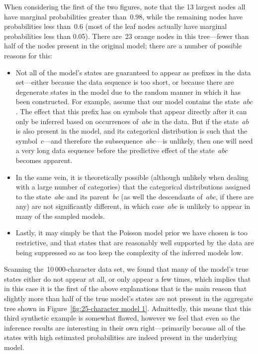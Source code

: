 \documentclass[12pt,a4paper]{article}
\begin{document}
When considering the first of the two figures, note that the 13 largest nodes
all have marginal probabilities greater than~0.98, while the remaining nodes
have probabilities less than~0.6 (most of the leaf nodes actually have marginal
probabilities less than 0.05). There are~23 orange nodes in this tree---fewer
than half of the nodes present in the original model; there are a number of
possible reasons for this:
\begin{itemize}
  \item Not all of the model's states are guaranteed to appear as prefixes in
    the data set---either because the data sequence is too short, or because
    there are degenerate states in the model due to the random manner in which
    it has been constructed. For example, assume that our model contains the
    state~\(abc\). The effect that this prefix has on symbols that appear
    directly after it can only be inferred based on occurrences of~\(abc\) in
    the data. But if the state~\(ab\) is also present in the model, and its
    categorical distribution is such that the symbol~\(c\)---and therefore the
    subsequence~\(abc\)---is unlikely, then one will need a very long data
    sequence before the predictive effect of the state~\(abc\) becomes
    apparent.
  \item In the same vein, it is theoretically possible (although unlikely when
    dealing with a large number of categories) that the categorical
    distributions assigned to the state~\(abc\) and its parent~\(bc\) (as well
    the descendants of~\(abc\), if there are any) are not significantly
    different, in which case~\(abc\) is unlikely to appear in many of the
    sampled models.
  \item Lastly, it may simply be that the Poisson model prior we have chosen is
    too restrictive, and that states that are reasonably well supported by the
    data are being suppressed so as too keep the complexity of the inferred
    models low.
\end{itemize}

Scanning the~10\,000-character data set, we found that many of the model's true
states either do not appear at all, or only appear a few times, which implies
that in this case it is the first of the above explanations that is the main
reason that slightly more than half of the true model's states are not present
in the aggregate tree shown in Figure~\ref{fig:25-character model 1}.
Admittedly, this means that this third synthetic example is somewhat flawed,
however we feel that even so the inference results are interesting in their own
right---primarily because all of the states with high estimated probabilities
are indeed present in the underlying model.
\end{document}
